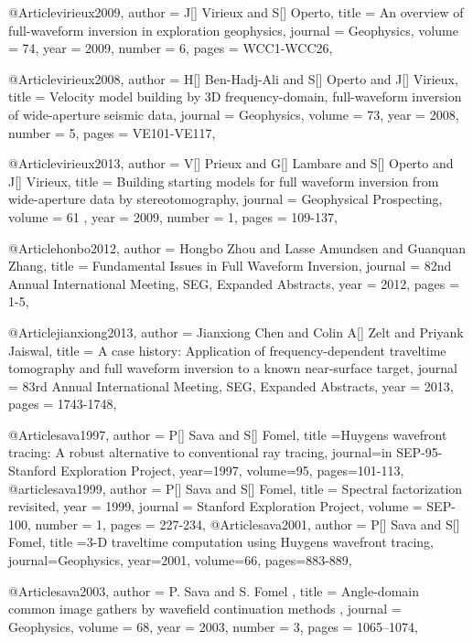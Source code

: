 @Article{virieux2009,
  author =	 { J[] Virieux and S[] Operto},
  title =	 {An overview of full-waveform inversion in exploration geophysics},
  journal =	 {Geophysics},
  volume =	 74,
  year =	 2009,
  number =	 6,
  pages =	 {WCC1-WCC26},
}

@Article{virieux2008,
  author =	 { H[] Ben-Hadj-Ali and S[] Operto and J[] Virieux},
  title =	 {Velocity model building by 3{D} frequency-domain, full-waveform inversion of wide-aperture seismic data},
  journal =	 {Geophysics},
  volume =	 73,
  year =	 2008,
  number =	 5,
  pages =	 {VE101-VE117},
}

@Article{virieux2013,
  author =	 { V[] Prieux and G[] Lambare  and S[] Operto and J[] Virieux},
  title =	 {Building starting models for full waveform inversion from wide-aperture data by stereotomography},
  journal =	 {Geophysical Prospecting},
  volume =	61 ,
  year =	 2009,
  number =	 1,
  pages =	 {109-137},
}



@Article{honbo2012,
  author = 	 {Hongbo Zhou and Lasse Amundsen and Guanquan Zhang},
  title = 	 {Fundamental Issues in Full Waveform Inversion},
  journal = 	 {82nd Annual International Meeting, SEG, Expanded Abstracts},
  year = 	 2012,
  pages =	 {1-5},
}

@Article{jianxiong2013,
  author = 	 {Jianxiong Chen and Colin A[] Zelt and Priyank Jaiswal},
  title = 	 {A case history: Application of frequency-dependent traveltime tomography and full waveform
inversion to a known near-surface target},
  journal = 	 {83rd Annual International Meeting, SEG, Expanded Abstracts},
  year = 	 2013,
  pages =	 {1743-1748},
}

@Article{sava1997,
  author = {P[] Sava and S[] Fomel},
  title ={Huygens wavefront tracing: A robust alternative to conventional ray tracing},
  journal={in SEP-95-Stanford Exploration Project},
  year=1997,
  volume=95,
  pages={101-113},
}
@article{sava1999,
  author =	 {P[] Sava and S[] Fomel},
  title =	 {Spectral factorization revisited},
  year =	 1999,
  journal =	 {Stanford Exploration Project},
  volume =	 SEP-100,
  number =	 1,
  pages =	 {227-234},
}
@Article{sava2001,
  author = {P[] Sava and S[] Fomel},
  title ={3-D traveltime computation using Huygens wavefront tracing},
  journal={Geophysics},
  year=2001,
  volume=66,
  pages={883-889},
}

@Article{sava2003,
  author =	 { P. Sava and S. Fomel },
  title =	 { Angle-domain common image gathers by wavefield
                  continuation methods },
  journal =	 {Geophysics},
  volume =	 68,
  year =	 2003,
  number =	 3,
  pages =	 {1065--1074},
}

